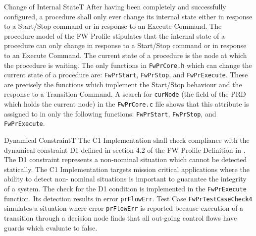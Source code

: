 \documentclass[a4paper,10pt]{article}
\newenvironment{fw_req}[6]
{\addtocounter{subsubsection}{1}
	\hspace{0.2cm}\textbf{FW-\arabic{section}.\arabic{subsection}.\arabic{subsubsection}/#2
	\hspace{0.8cm} #1}
	\vspace{-10pt}
\begin{longtable}{p{2.7cm}P{8.5cm}}
\hline
\textsc{Requirement} & #3 \\
\textsc{Justification} & #4 \\
\textsc{Implementation} & #5  \\ 
\textsc{Verification} & #6  \\
\hline
}
{\end{longtable}}
\begin{document}
\begin{fw_req}{Change of Internal State}{T}
{After having been completely and successfully configured, a procedure shall 
only ever change its internal state either in response to a Start/Stop command or in response to 
an Execute Command.}
{The procedure model of the FW Profile stipulates that the internal state 
of a procedure can only change in response to a Start/Stop command or in response to an Execute 
Command.}
{The current state of a procedure is the node at which the procedure is 
waiting.
The only functions in \texttt{FwPrCore.h} which can change the current state of a procedure 
are: \texttt{FwPrStart}, \texttt{FwPrStop}, and \texttt{FwPrExecute}. 
These are precisely the functions which implement the Start/Stop behaviour and the response to a 
Transition Command.} 
{A search for \texttt{curNode} (the field of the PRD which holds the 
current node) in the \texttt{FwPrCore.c} file shows that this attribute is assigned to in only 
the following functions: \texttt{FwPrStart}, \texttt{FwPrStop}, and \texttt{FwPrExecute}.}
\end{fw_req}


\begin{fw_req}{Dynamical Constraint}{T}
{The C1 Implementation shall check compliance with the dynamical constraint 
D1 defined in section 4.2 of the FW Profile Definition in \cite{ref:fwprofile}.}
{The D1 constraint represents a non-nominal situation which cannot be detected statically. 
The C1 Implementation targets mission critical applications where the ability to detect non-
nominal situations is important to guarantee the integrity of a system.}
{The check for the D1 condition is implemented in the 
\texttt{FwPrExecute} function. 
Its detection results in error \texttt{prFlowErr}.} 
{Test Case \texttt{FwPrTestCaseCheck4} simulates a situation where error 
\texttt{prFlowErr} is reported because execution of a transition through a decision node finds 
that all out-going control flows have guards which evaluate to false.}
\end{fw_req}
\end{document}
